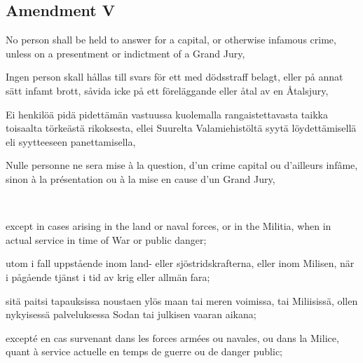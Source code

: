 \documentclass[a4,landscape,12pt]{article}
\begin{document}
\subsection*{Amendment V}
\begin{minipage}[t]{0.22\textwidth}
No person shall be held to answer for a capital, or otherwise infamous crime, unless on a presentment or indictment of a Grand Jury,
\end{minipage}\textwidth
\begin{minipage}[t]{0.22\textwidth}
Ingen person skall hållas till svars för ett med dödsstraff belagt, eller på annat sätt infamt brott, såvida icke på ett föreläggande eller åtal av en Åtalsjury,
\end{minipage}\textwidth
\begin{minipage}[t]{0.22\textwidth}
Ei henkilöä pidä pidettämän vastuussa kuolemalla rangaistettavasta taikka toisaalta törkeästä rikoksesta, ellei Suurelta Valamiehistöltä syytä löydettämisellä eli syytteeseen panettamisella,
\end{minipage}\textwidth
\begin{minipage}[t]{0.22\textwidth}
Nulle personne ne sera mise à la question, d'un crime capital ou d'ailleurs infâme, sinon à la présentation ou à la mise en cause d'un Grand Jury,
\end{minipage}

~

\begin{minipage}[t]{0.22\textwidth}
except in cases arising in the land or naval forces, or in the Militia, when in actual service in time of War or public danger;
\end{minipage}\textwidth
\begin{minipage}[t]{0.22\textwidth}
utom i fall uppstående inom land- eller sjöstridskrafterna, eller inom Milisen, när i pågående tjänst i tid av krig eller allmän fara;
\end{minipage}\textwidth
\begin{minipage}[t]{0.22\textwidth}
sitä paitsi tapauksissa noustaen ylös maan tai meren voimissa, tai Miliisissä, ollen nykyisessä palveluksessa Sodan tai julkisen vaaran aikana;
\end{minipage}\textwidth
\begin{minipage}[t]{0.22\textwidth}
excepté en cas survenant dans les forces armées ou navales, ou dans la Milice, quant à service actuelle en temps de guerre ou de danger public;
\end{minipage}
\end{document}
